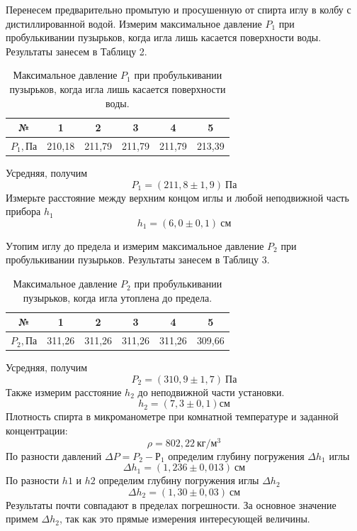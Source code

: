\documentclass[a4paper,12pt]{article}
\theoremstyle{plain} %
\theoremstyle{definition} %
\theoremstyle{remark} %
\begin{document}
	Перенесем предварительно промытую и просушенную от спирта иглу в колбу с дистиллированной водой. Измерим максимальное давление $P_1$ при пробулькивании пузырьков, когда игла лишь касается поверхности воды. Результаты занесем в Таблицу 2.
	\begin{table}[H]
		\begin{center}
		\begin{tabular}{|c|c|c|c|c|c|}
			\hline
			№ & 1         & 2         & 3         & 4         & 5         \\ \hline
			$P_1, \text{Па}$ & 210,18 & 211,79& 211,79 & 211,79 & 213,39 \\ \hline
		\end{tabular}
	\captionsetup{justification=centering}
	\caption{Максимальное давление $P_1$ при пробулькивании пузырьков, когда игла лишь касается поверхности воды.}
	\end{center}
	\end{table}
	\noindent Усредняя, получим
	\[P_1 = (211,8\pm 1,9)\ \text{Па}    \]
	Измерьте расстояние между верхним концом иглы и любой неподвижной часть прибора $h_1$
	\[h_1 = (6,0\pm0,1)\ \text{см} \]
	
	Утопим иглу до предела и измерим максимальное давление $P_2$ при пробулькивании пузырьков. Результаты занесем в Таблицу 3.
	\begin{table}[H]
		\begin{center}
		\begin{tabular}{|c|c|c|c|c|c|}
			\hline
			№ & 1      & 2      & 3      & 4      & 5      \\ \hline
			$P_2, \text{Па}$ & 311,26 & 311,26 & 311,26 & 311,26 & 309,66 \\ \hline
		\end{tabular}
		\captionsetup{justification=centering}
	\caption{Максимальное давление $P_2$ при пробулькивании пузырьков, когда игла утоплена до предела.}
	\end{center}
	\end{table}
	\noindent Усредняя, получим
	\[P_2 = (310,9\pm 1,7)\ \text{Па}\]
	Также измерим расстояние $h_2$ до неподвижной части установки.
	\[h_2 = (7,3\pm0,1)\text{см} \]
	Плотность спирта в микроманометре при комнатной температуре и заданной концентрации:
	\[\rho = 802,22\ \text{кг}/\text{м}^3 \]
	По разности давлений $\Delta P = P_2 - Р_1$ определим глубину погружения $\Delta h_1$ иглы 
	\[\Delta h_1 = (1,236\pm0,013)\  \text{см}  \]
	По разности $h1$ и $h2$ определим глубину погружения иглы $\Delta h_2$
	\[\Delta h_2 = (1,30\pm0,03)\ \text{см} \]
	Результаты почти совпадают в пределах погрешности. За основное значение примем $\Delta h_2$, так как это прямые измерения интересующей величины.
	
\end{document}
